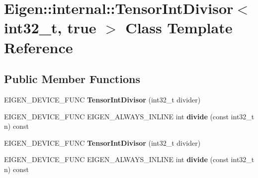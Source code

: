 \hypertarget{class_eigen_1_1internal_1_1_tensor_int_divisor_3_01int32__t_00_01true_01_4}{}\section{Eigen\+:\+:internal\+:\+:Tensor\+Int\+Divisor$<$ int32\+\_\+t, true $>$ Class Template Reference}
\label{class_eigen_1_1internal_1_1_tensor_int_divisor_3_01int32__t_00_01true_01_4}
\subsection*{Public Member Functions}
\begin{DoxyCompactItemize}
\item 
\mbox{\label{class_eigen_1_1internal_1_1_tensor_int_divisor_3_01int32__t_00_01true_01_4_adb741d416f062074b8f94e12ee236da2}} 
E\+I\+G\+E\+N\+\_\+\+D\+E\+V\+I\+C\+E\+\_\+\+F\+U\+NC {\bfseries Tensor\+Int\+Divisor} (int32\+\_\+t divider)
\item 
\mbox{\label{class_eigen_1_1internal_1_1_tensor_int_divisor_3_01int32__t_00_01true_01_4_a885b955daff321853d24fdc6ba9e24ed}} 
E\+I\+G\+E\+N\+\_\+\+D\+E\+V\+I\+C\+E\+\_\+\+F\+U\+NC E\+I\+G\+E\+N\+\_\+\+A\+L\+W\+A\+Y\+S\+\_\+\+I\+N\+L\+I\+NE int {\bfseries divide} (const int32\+\_\+t n) const
\item 
\mbox{\label{class_eigen_1_1internal_1_1_tensor_int_divisor_3_01int32__t_00_01true_01_4_adb741d416f062074b8f94e12ee236da2}} 
E\+I\+G\+E\+N\+\_\+\+D\+E\+V\+I\+C\+E\+\_\+\+F\+U\+NC {\bfseries Tensor\+Int\+Divisor} (int32\+\_\+t divider)
\item 
\mbox{\label{class_eigen_1_1internal_1_1_tensor_int_divisor_3_01int32__t_00_01true_01_4_a885b955daff321853d24fdc6ba9e24ed}} 
E\+I\+G\+E\+N\+\_\+\+D\+E\+V\+I\+C\+E\+\_\+\+F\+U\+NC E\+I\+G\+E\+N\+\_\+\+A\+L\+W\+A\+Y\+S\+\_\+\+I\+N\+L\+I\+NE int {\bfseries divide} (const int32\+\_\+t n) const
\end{DoxyCompactItemize}


